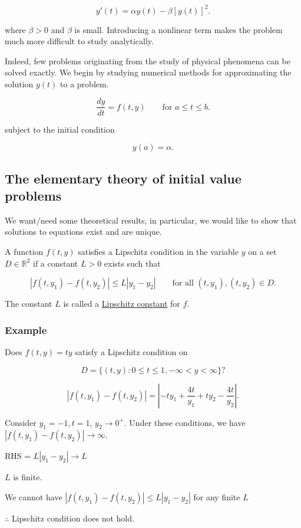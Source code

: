 \begin{equation*}
  y'(t) = \alpha y(t) - \beta [y(t)]^2
.\end{equation*}

where $\beta > 0$ and $\beta$ is small. Introducing a nonlinear term makes the
problem much more difficult to study analytically.

Indeed, few problems originating from the study of physical phenomena can be
solved exactly. We begin by studying numerical methods for approximating the
solution $y(t)$ to a problem.

\[
  \frac{dy}{dt} = f(t, y) \qquad \text{for } a \leq t \leq b
.\]

subject to the initial condition 

\[
y(a) = \alpha
.\]

\subsection{The elementary theory of initial value problems}

We want/need some theoretical results, in particular, we would like to show that
solutions to equations exist and are unique.

 A function $f(t,y)$ satisfies a Lipschitz condition in the variable $y$ on
a set $D \in \mathbb{R}^2$ if a constant $L > 0$ exists such that

\[
  |f(t,y_1) - f(t, y_2)| \leq L|y_1 - y_2| \qquad \text{for all } (t,y_1), (t,y_2) \in D
.\]

The constant $L$ is called a \uline{Lipschitz constant} for $f$.

\pagebreak
\subsubsection{Example}

Does $f(t,y) = ty$ satisfy a Lipschitz condition on 

\[
D  = \{(t,y) : 0 \leq t \leq 1, -\infty < y < \infty\}
?\]

\noindent
\soln


\begin{equation*}
|f(t,y_1) - f(t, y_2)| = |-ty_1 + \frac{4t}{y_1} + ty_2 - \frac{4t}{y_2}|
.\end{equation*}


Consider $y_1 = -1, t=1$, $y_2 \to 0^+$. Under these conditions, we have
$|f(t,y_1) - f(t,y_2)| \to \infty$.

RHS = $L|y_1-y_2| \to L$

$L$ is finite.

We cannot have $|f(t,y_1) - f(t,y_2)| \leq L|y_1 - y_2|$ for any finite $L$

$\therefore$ Lipschitz condition does not hold.

